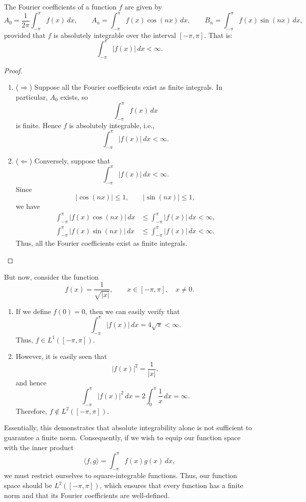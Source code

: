 \documentclass[10pt,a4paper]{article}
\begin{document}
\begin{theorem}
The Fourier coefficients of a function \(f\) are given by
\[
    A_0=\frac{1}{2\pi}\int_{-\pi}^{\pi}f(x)\,dx,
    \qquad
    A_n=\int_{-\pi}^{\pi}f(x)\cos(nx)\,dx,
    \qquad
    B_n=\int_{-\pi}^{\pi}f(x)\sin(nx)\,dx,
\]
provided that \(f\) is absolutely integrable over the
interval \([-\pi,\pi]\). That is: 
\[
    \int_{-\pi}^{\pi}|f(x)|\,dx<\infty.
\]
\end{theorem}
\begin{proof}
\begin{enumerate}
    \item (\(\Rightarrow\)) Suppose all the Fourier coefficients exist as
finite integrals. In particular, \(A_0\) exists, so
\[
    \int_{-\pi}^{\pi}f(x)\,dx
\]
is finite. Hence \(f\) is absolutely integrable, i.e.,
\[
    \int_{-\pi}^{\pi}|f(x)|\,dx<\infty.
\]
\item (\(\Leftarrow\)) Conversely, suppose that
\[
    \int_{-\pi}^{\pi}|f(x)|\,dx<\infty.
\]
Since
\[
    |\cos(nx)|\leq 1,
    \qquad
    |\sin(nx)|\leq 1,
\]
we have
\[
\begin{aligned}
    \int_{-\pi}^{\pi}|f(x)\cos(nx)|\,dx
    &\leq \int_{-\pi}^{\pi}|f(x)|\,dx<\infty,\\
    \int_{-\pi}^{\pi}|f(x)\sin(nx)|\,dx
    &\leq \int_{-\pi}^{\pi}|f(x)|\,dx<\infty.
\end{aligned}
\]
Thus, all the Fourier coefficients exist as finite 
integrals.
\end{enumerate}
\end{proof}

\begin{example}
But now, consider the function
\[
    f(x)=\frac{1}{\sqrt{|x|}},
    \qquad x\in[-\pi,\pi],\quad x\neq 0.
\]
\begin{enumerate}
    \item If we define \(f(0)=0\), then we can easily verify that
\[
    \int_{-\pi}^{\pi}|f(x)|\,dx
    =4\sqrt{\pi}<\infty.
\]
Thus, \(f\in L^1([-\pi,\pi])\).
\item However, it is easily seen that
\[
    |f(x)|^2=\frac{1}{|x|},
\]
and hence
\[
    \int_{-\pi}^{\pi}|f(x)|^2\,dx
    =2\int_0^\pi\frac{1}{x}\,dx
    =\infty.
\]
Therefore, \(f\notin L^2([-\pi,\pi])\).
\end{enumerate}
\end{example}


Essentially, this demonstrates that absolute integrability alone is
not sufficient to guarantee a finite norm. Consequently, if
we wish to equip our function space with the inner product
\[
    \langle f,g\rangle
    =\int_{-\pi}^{\pi}f(x)g(x)\,dx,
\]
we must restrict ourselves to square-integrable functions.
Thus, our function space should be \(L^2([-\pi,\pi])\),
which ensures that every function has a finite norm and that
its Fourier coefficients are well-defined.
\end{document}
